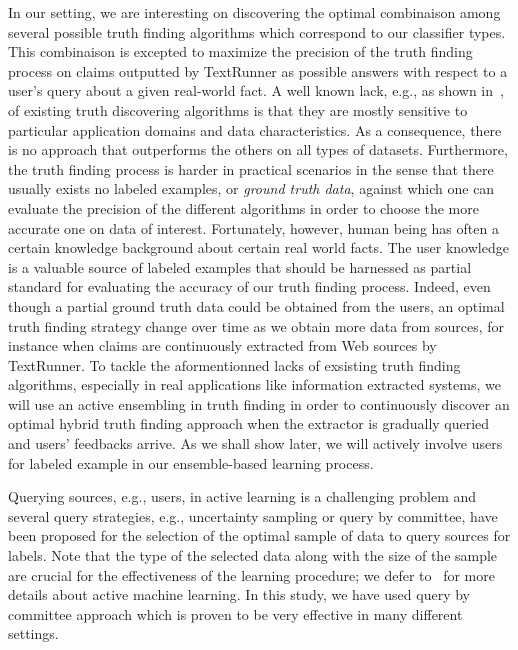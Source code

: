 In our setting, we are interesting on discovering the optimal combinaison among several possible truth finding algorithms
which correspond to our classifier types.
This combinaison is excepted to maximize the precision of the truth finding process on claims outputted by TextRunner as 
possible answers with respect to a user's query about a given real-world fact.
A well known lack, e.g., as shown in~\cite{Li12, Wagui14}, of existing truth discovering algorithms is that they are mostly sensitive
to particular application domains and data characteristics. As a consequence, there is no approach that outperforms the others on all 
types of datasets. Furthermore, the truth finding process is harder in practical scenarios in the sense that there usually exists
no labeled examples, or \emph{ground truth data}, against which one can evaluate the precision of the different algorithms in order to choose
the more accurate one on data of interest.  Fortunately, however, human being has often a certain knowledge background about certain real world facts.
The user knowledge is a valuable source of labeled examples that should be harnessed as partial standard for evaluating the accuracy of our truth finding 
process. Indeed, even though a partial ground truth data could be obtained from the users, an optimal truth finding strategy change over time as we obtain
more data from sources, for instance when claims are continuously extracted from Web sources by TextRunner.
To tackle the aformentionned lacks of exsisting truth finding algorithms, especially in real applications like information extracted systems, 
we will use an active ensembling in truth finding in order to continuously discover an optimal hybrid truth finding approach when the extractor is gradually
queried and users' feedbacks arrive. As we shall show later, we will actively involve users for labeled example in our ensemble-based learning process.

Querying sources, e.g., users, in active learning is a challenging problem and several query strategies, e.g., uncertainty sampling or query by committee, 
have been proposed for the selection of the optimal sample of data to query sources for labels. Note that the type of the selected data along with the size
of the sample are crucial for the effectiveness of the learning procedure; we defer to~\cite{burr12} for more details about active machine learning. 
In this study, we have used query by committee approach which is proven to be very effective in many different settings.


